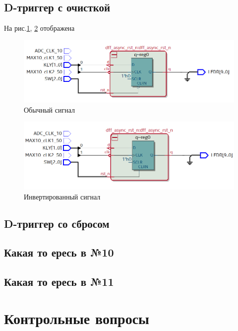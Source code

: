 \documentclass[a4paper,14pt]{article}
\begin{document}
\subsection{D-триггер с очисткой}

На рис.\ref{fig:8_RTL_sample}, \ref{fig:8_RTL_neinv} отображена

\begin{figure}[H]
	\centering
	\includegraphics[width=0.7\linewidth]{imgs/8_RTL_sample}
	\caption{Обычный сигнал}
	\label{fig:8_RTL_sample}
\end{figure}

\begin{figure}[H]
	\centering
	\includegraphics[width=0.7\linewidth]{imgs/8_RTL_neinv}
	\caption{Инвертированный сигнал}
	\label{fig:8_RTL_neinv}
\end{figure}

\subsection{D-триггер со сбросом}


\subsection{Какая то ересь в №10}


\subsection{Какая то ересь в №11}


\section{Контрольные вопросы}
\end{document}
